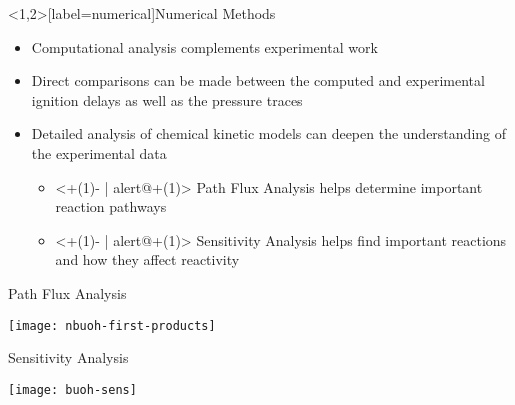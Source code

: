 \documentclass{beamer}
\begin{document}
\begin{frame}<1,2>[label=numerical]{Numerical Methods}
    \begin{itemize}
        \item Computational analysis complements experimental work
        \item Direct comparisons can be made between the computed and experimental
            ignition delays as well as the pressure traces
        \item Detailed analysis of chemical kinetic models can deepen the
            understanding of the experimental data
            \begin{itemize}
                \item<+(1)- | alert@+(1)> Path Flux Analysis helps determine important reaction pathways
                \item<+(1)- | alert@+(1)> Sensitivity Analysis helps find important reactions and how they affect reactivity
            \end{itemize}
    \end{itemize}
\end{frame}

\begin{frame}{Path Flux Analysis}
    \begin{center}
        \texttt{[image: nbuoh-first-products]}
    \end{center}
\end{frame}


\begin{frame}{Sensitivity Analysis}
    \begin{center}
        \texttt{[image: buoh-sens]}
    \end{center}
\end{frame}
\end{document}
